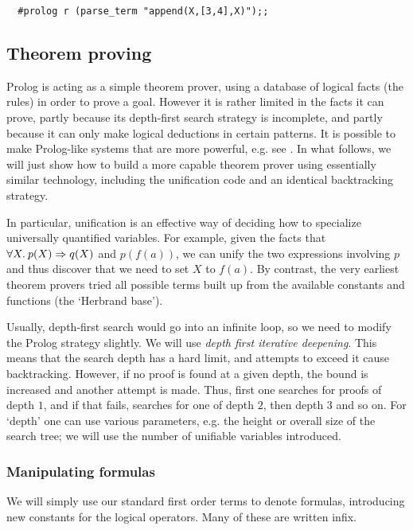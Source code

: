 \begin{boxed}\begin{verbatim}
  #prolog r (parse_term "append(X,[3,4],X)");;
\end{verbatim}\end{boxed}

\subsection{Theorem proving}

Prolog is acting as a simple theorem prover, using a database of logical facts
(the rules) in order to prove a goal. However it is rather limited in the facts
it can prove, partly because its depth-first search strategy is incomplete, and
partly because it can only make logical deductions in certain patterns. It is
possible to make Prolog-like systems that are more powerful, e.g. see
. In what follows, we will just show how to build a more
capable theorem prover using essentially similar technology, including the
unification code and an identical backtracking strategy.

In particular, unification is an effective way of deciding how to specialize
universally quantified variables. For example, given the facts that
$\forall X.\: p(X) \Rightarrow q(X)$ and $p(f(a))$, we can unify the two
expressions involving $p$ and thus discover that we need to set
$X$ to $f(a)$. By contrast, the very earliest theorem provers tried all
possible terms built up from the available constants and functions (the
`Herbrand base').

Usually, depth-first search would go into an infinite loop, so we need to
modify the Prolog strategy slightly. We will use {\em depth first iterative
deepening}. This means that the search depth has a hard limit, and attempts to
exceed it cause backtracking. However, if no proof is found at a given depth,
the bound is increased and another attempt is made. Thus, first one searches
for proofs of depth $1$, and if that fails, searches for one of depth $2$, then
depth $3$ and so on. For `depth' one can use various parameters, e.g. the
height or overall size of the search tree; we will use the number of unifiable
variables introduced.

\subsubsection*{Manipulating formulas}

We will simply use our standard first order terms to denote formulas,
introducing new constants for the logical operators. Many of these are written
infix.

